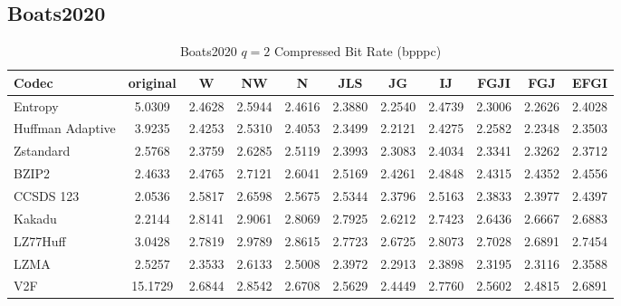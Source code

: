 \documentclass{article}
\begin{document}
\subsection{Boats2020}
\begin{table}[h!]
\centering
\caption{Boats2020 $q=2$ Compressed Bit Rate (bpppc)}
\begin{tabular}{|l|cccccccccc|}
\hline
Codec &  original &      W &     NW &      N &    JLS &     JG &     IJ &   FGJI &    FGJ &   EFGI \\
\hline
Entropy & 5.0309 & 2.4628 & 2.5944 & 2.4616 & 2.3880 & 2.2540 & 2.4739 & 2.3006 & 2.2626 & 2.4028 \\
\hline
Huffman Adaptive &    3.9235 & 2.4253 & 2.5310 & 2.4053 & 2.3499 & 2.2121 & 2.4275 & 2.2582 & 2.2348 & 2.3503 \\
Zstandard        &    2.5768 & 2.3759 & 2.6285 & 2.5119 & 2.3993 & 2.3083 & 2.4034 & 2.3341 & 2.3262 & 2.3712 \\
BZIP2            &    2.4633 & 2.4765 & 2.7121 & 2.6041 & 2.5169 & 2.4261 & 2.4848 & 2.4315 & 2.4352 & 2.4556 \\
CCSDS 123        &    2.0536 & 2.5817 & 2.6598 & 2.5675 & 2.5344 & 2.3796 & 2.5163 & 2.3833 & 2.3977 & 2.4397 \\
Kakadu           &    2.2144 & 2.8141 & 2.9061 & 2.8069 & 2.7925 & 2.6212 & 2.7423 & 2.6436 & 2.6667 & 2.6883 \\
LZ77Huff         &    3.0428 & 2.7819 & 2.9789 & 2.8615 & 2.7723 & 2.6725 & 2.8073 & 2.7028 & 2.6891 & 2.7454 \\
LZMA             &    2.5257 & 2.3533 & 2.6133 & 2.5008 & 2.3972 & 2.2913 & 2.3898 & 2.3195 & 2.3116 & 2.3588 \\
V2F              &   15.1729 & 2.6844 & 2.8542 & 2.6708 & 2.5629 & 2.4449 & 2.7760 & 2.5602 & 2.4815 & 2.6891 \\
\hline
\end{tabular}
\end{table}
\end{document}
